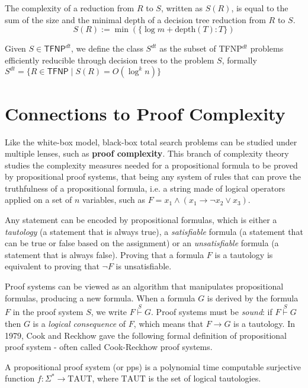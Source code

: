 The complexity of a reduction from $R$ to $S$, written as $S(R)$, is equal to the sum of the size and the minimal depth of a decision tree reduction from $R$ to $S$.
\[S(R) := \min(\{\log m + \mathrm{depth}(T) : T\})\]

\begin{definition}
 Given $S \in \mathsf{TFNP}^{dt}$, we define the class $S^{dt}$ as the subset of \textsf{TFNP}$^{dt}$ problems efficiently reducible through decision trees to the problem $S$, formally $S^{dt} = \{R \in \mathsf{TFNP} \mid S(R) = O(\log^k n)\}$
\end{definition}

\section{Connections to Proof Complexity}

Like the white-box model, black-box total search problems can be studied under multiple lenses, such as \textbf{proof complexity}. This branch of complexity theory studies the complexity measures needed for a propositional formula to be proved by propositional proof systems, that being any system of rules that can prove the truthfulness of a propositional formula, i.e. a string made of logical operators applied on a set of $n$ variables, such as $F = x_1 \land (x_1 \to \lnot x_2 \lor x_3)$.

Any statement can be encoded by propositional formulas, which is either a \textit{tautology} (a statement that is always true), a \textit{satisfiable} formula (a statement that can be true or false based on the assignment) or an \textit{unsatisfiable} formula (a statement that is always false). Proving that a formula $F$ is a tautology is equivalent to proving that $\lnot F$ is unsatisfiable.

Proof systems can be viewed as an algorithm that manipulates propositional formulas, producing a new formula. When a formula $G$ is derived by the formula $F$ in the proof system $S$, we write $F \stackrel{S}{\vdash} G$. Proof systems must be \textit{sound}: if $F \stackrel{S}{\vdash} G$ then $G$ is a \textit{logical consequence} of $F$, which means that $F \to G$ is a tautology. In 1979, Cook and Reckhow gave the following formal definition of propositional proof system - often called Cook-Reckhow proof systems.

\begin{definition}
 A propositional proof system (or pps) is a polynomial time computable surjective function $f : \Sigma^* \to \mathrm{TAUT}$, where $\mathrm{TAUT}$ is the set of logical tautologies.
\end{definition}

